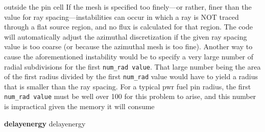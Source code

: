 {{        outside the pin cell
        \newline\newline
        If the mesh is specified too finely---or rather, finer than
        the value for ray spacing---instabilities can occur in which a ray is NOT
        traced through a flat source region, and no flux is calculated for that
        region. The code will automatically adjust the azimuthal discretization
        if the given ray spacing value is too coarse (or because the azimuthal mesh
        is too fine). Another way to cause the aforementioned instability would be to
        specify a very large number of radial subdivisions for the first
        \texttt{num\_rad value}. That large number being the area of the first radius
        divided by the first \texttt{num\_rad} value would have to yield a radius that
        is smaller than the ray spacing. For a typical \ac{pwr} fuel pin radius, the
        first \texttt{num\_rad value} must be well over 100 for this problem to
        arise, and this number is impractical given the memory it will consume}
   }

   {\bf delayenergy} delayenergy

